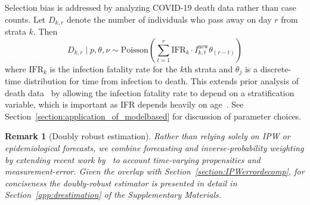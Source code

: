 \documentclass[11pt]{amsart}
\numberwithin{equation}{section}
\theoremstyle{plain}
\newtheorem{remark}{Remark}
\def\new{\text{new}}
\begin{document}
 Selection bias is addressed by analyzing COVID-19 death data rather than case counts.  Let $D_{k,r}$ denote the number of individuals who pass away on day $r$ from strata $k$.  Then
 $$
 D_{k,r} \mid p, \theta, \nu \sim \text{Poisson} \left( \sum_{t=1}^r \text{IFR}_{k} \cdot I^\new_{k,t} \theta_{(r-t)} \right)
 $$
 where $\text{IFR}_{k}$ is the infection fatality rate for the $k$th strata and $\theta_{j}$ is a discrete-time distribution for time from infection to death.  This extends prior analysis of death data~\cite{Johndrow2020} by allowing the infection fatality rate to depend on a stratification variable, which is important as IFR depends heavily on age~\citep{Levin2020}. See Section~\ref{section:application_of_modelbased} for discussion of parameter choices.  %


 \begin{remark}[Doubly robust estimation]
Rather than relying solely on IPW or epidemiological forecasts, we combine forecasting and inverse-probability weighting by extending recent work by~\cite{Chen2019} to account time-varying propensities and measurement-error. Given the overlap with Section~\ref{section:IPWerrordecomp}, for conciseness the doubly-robust estimator is presented in detail in Section~\ref{app:drestimation} of the Supplementary Materials.
 \end{remark}
\end{document}
